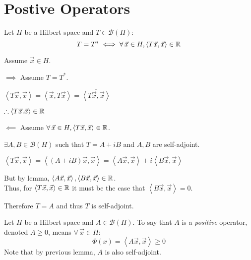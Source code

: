 \documentclass[letterpaper,12pt,fleqn]{article}
\newcommand{\mb}{\mathcal{B}}
\renewcommand{\P}{\Phi}
\newcommand{\inner}[1]{\left<#1\right>}
\newcommand{\conj}[1]{\overline{#1}}
\newcommand{\vx}{\vec{x}}
\begin{document}
\section*{Postive Operators}

\begin{lemma}
  Let $H$ be a Hilbert space and $T\in\mb(H)$:
  \[T=T^*\iff\forall\,\vx\in H,\inner{T\vx,\vx}\in\R\]
\end{lemma}

\begin{theproof}
  Assume $\vx\in H$.

  \begin{description}
  \item $\implies$ Assume $T=T^*$.
      
    $\inner{T\vx,\vx}=\inner{\vx,T\vx}=\conj{\inner{T\vx,\vx}}$
      
    $\therefore\inner{T\vx.\vx}\in\R$

  \item $\impliedby$ Assume $\forall\,\vx\in H,\inner{T\vx,\vx}\in\R$.

    $\exists A,B\in\mb(H)$ such that $T=A+iB$ and $A,B$ are self-adjoint.

    $\inner{T\vx,\vx}=\inner{(A+iB)\vx,\vx}=\inner{A\vx,\vx}+i\inner{B\vx,\vx}$

    But by lemma, $\inner{A\vx,\vx},\inner{B\vx,\vx}\in\R$. \\
    Thus, for $\inner{T\vx,\vx}\in\R$ it must be the case that
    $\inner{B\vx,\vx}=0$.

    Therefore $T=A$ and thus $T$ is self-adjoint.
  \end{description}
\end{theproof}

\begin{definition}
  Let $H$ be a Hilbert space and $A\in\mb(H)$. To say that $A$ is a
  \emph{positive} operator, denoted $A\ge0$, means $\forall\,\vx\in H$:
  \[\P(x)=\inner{A\vx,\vx}\ge0\]
  Note that by previous lemma, $A$ is also self-adjoint.
\end{definition}
\end{document}
